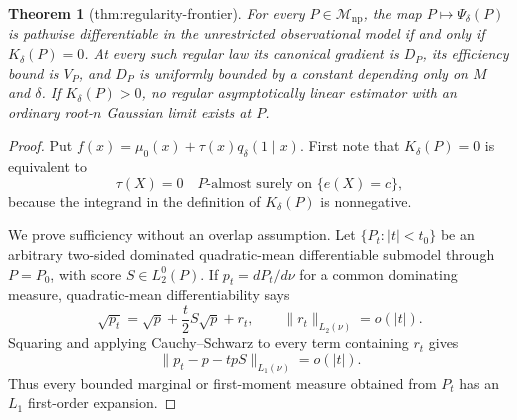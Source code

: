 \documentclass{article}
\newtheorem{theorem}{Theorem}
\begin{document}
\begin{theorem}[thm:regularity-frontier]\label{thm:regularity-frontier}
For every \(P\in\mathcal M_{\mathrm{np}}\), the map \(P\mapsto\Psi_\delta(P)\) is pathwise differentiable in the unrestricted observational model if and only if \(K_\delta(P)=0\). At every such regular law its canonical gradient is \(D_P\), its efficiency bound is \(V_P\), and \(D_P\) is uniformly bounded by a constant depending only on \(M\) and \(\delta\). If \(K_\delta(P)>0\), no regular asymptotically linear estimator with an ordinary root-\(n\) Gaussian limit exists at \(P\).
\end{theorem}
\begin{proof}
Put \(f(x)=\mu _0(x)+\tau(x)q_\delta(1\mid x)\).  First note that \(K_\delta(P)=0\) is equivalent to
\begin{equation}
 \tau(X)=0\quad P\text{-almost surely on }\{e(X)=c\},                                      \tag{1}
\end{equation}
because the integrand in the definition of \(K_\delta(P)\) is nonnegative.

We prove sufficiency without an overlap assumption.  Let \(\{P_t:|t|<t_0\}\) be an arbitrary two-sided dominated quadratic-mean differentiable submodel through \(P=P_0\), with score \(S\in L_2^0(P)\).  If \(p_t=dP_t/d\nu\) for a common dominating measure, quadratic-mean differentiability says
\begin{equation}
 \sqrt{p_t}=\sqrt p+\frac t2S\sqrt p+r_t,\qquad \|r_t\|_{L_2(\nu)}=o(|t|).
\end{equation}
Squaring and applying Cauchy--Schwarz to every term containing \(r_t\) gives
\begin{equation}
 \|p_t-p-tpS\|_{L_1(\nu)}=o(|t|).                                                        \tag{2}
\end{equation}
Thus every bounded marginal or first-moment measure obtained from \(P_t\) has an \(L_1\) first-order expansion.


\end{proof}
\end{document}

